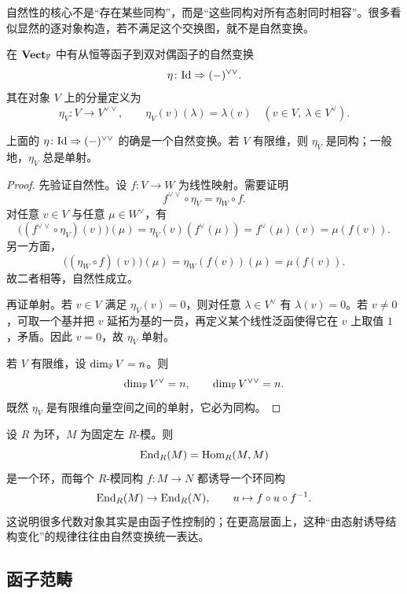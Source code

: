 \begin{remark}
自然性的核心不是“存在某些同构”，而是“这些同构对所有态射同时相容”。很多看似显然的逐对象构造，若不满足这个交换图，就不是自然变换。
\end{remark}

\begin{example}[双对偶自然变换]
在 $\mathbf{Vect}_{\mathbb{F}}$ 中有从恒等函子到双对偶函子的自然变换
\[
  \eta\colon \mathrm{Id} \Rightarrow (-)^{\vee\vee}.
\]
其在对象 $V$ 上的分量定义为
\[
  \eta_V\colon V\to V^{\vee\vee},
  \qquad
  \eta_V(v)(\lambda)=\lambda(v)
  \quad (v\in V,\ \lambda\in V^{\vee}).
\]
\end{example}

\begin{proposition}
上面的 $\eta\colon \mathrm{Id} \Rightarrow (-)^{\vee\vee}$ 的确是一个自然变换。若 $V$ 有限维，则 $\eta_V$ 是同构；一般地，$\eta_V$ 总是单射。
\end{proposition}

\begin{proof}
先验证自然性。设 $f\colon V\to W$ 为线性映射。需要证明
\[
  f^{\vee\vee}\circ \eta_V = \eta_W\circ f.
\]
对任意 $v\in V$ 与任意 $\mu\in W^{\vee}$，有
\[
  \bigl((f^{\vee\vee}\circ \eta_V)(v)\bigr)(\mu)
  = \eta_V(v)(f^{\vee}(\mu))
  = f^{\vee}(\mu)(v)
  = \mu(f(v)).
\]
另一方面，
\[
  \bigl((\eta_W\circ f)(v)\bigr)(\mu)
  = \eta_W(f(v))(\mu)
  = \mu(f(v)).
\]
故二者相等，自然性成立。

再证单射。若 $v\in V$ 满足 $\eta_V(v)=0$，则对任意 $\lambda\in V^{\vee}$ 有 $\lambda(v)=0$。若 $v\neq 0$，可取一个基并把 $v$ 延拓为基的一员，再定义某个线性泛函使得它在 $v$ 上取值 $1$，矛盾。因此 $v=0$，故 $\eta_V$ 单射。

若 $V$ 有限维，设 $\dim_{\mathbb{F}}V=n$。则
\[
  \dim_{\mathbb{F}}V^{\vee}=n,
  \qquad
  \dim_{\mathbb{F}}V^{\vee\vee}=n.
\]
既然 $\eta_V$ 是有限维向量空间之间的单射，它必为同构。
\end{proof}

\begin{example}
设 $R$ 为环，$M$ 为固定左 $R$-模。则
\[
  \mathrm{End}_R(M)=\mathrm{Hom}_R(M,M)
\]
是一个环，而每个 $R$-模同构 $f\colon M\to N$ 都诱导一个环同构
\[
  \mathrm{End}_R(M)\to \mathrm{End}_R(N),
  \qquad
  u\mapsto f\circ u\circ f^{-1}.
\]
这说明很多代数对象其实是由函子性控制的；在更高层面上，这种“由态射诱导结构变化”的规律往往由自然变换统一表达。
\end{example}

\subsection{函子范畴}

